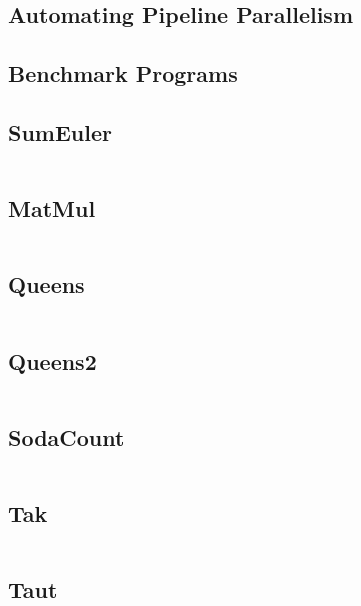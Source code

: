 \documentclass[openright, dottedtoc, headinclude, footinclude=true, a4paper, numbers=noenddot]{scrreprt}
\begin{document}
        \section{Automating Pipeline Parallelism}
        \label{sec:autoPipe}
        
    
    

\begin{appendices}

\chapter{Benchmark Programs}
\label{append:bench}

    \section{SumEuler}
    \inputminted{haskell}{benchmarks/SumEuler.hs}
    \clearpage

    \section{MatMul}
    \inputminted{haskell}{benchmarks/MatMul.hs}
    \clearpage

    \section{Queens}
    \inputminted{haskell}{benchmarks/Queens.hs}
    \clearpage

    \section{Queens2}
    \inputminted{haskell}{benchmarks/Queens2.hs}
    \clearpage

    \section{SodaCount}
    \inputminted{haskell}{benchmarks/SodaCount.hs}
    \clearpage

    \section{Tak}
    \inputminted{haskell}{benchmarks/tak.hs}
    \clearpage

    \section{Taut}
    \inputminted{haskell}{benchmarks/Taut.hs}
    \clearpage

\end{appendices}

\listoftodos[Notes]

\if@openright
  \cleardoublepage
\else
  \clearpage
\fi



\end{document}
